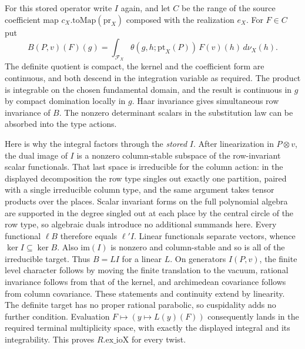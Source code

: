 For this stored operator write $I$ again, and let $C$ be the range
of the source coefficient map $c_X.\mathrm{toMap}(\mathrm{pr}_X)$
composed with the realization $e_X$. For $F\in C$ put
\[
 B(P,v)(F)(g)=\int_{\mathcal F_X}
      \theta(g,h;\mathrm{pt}_X(P))\,F(v)(h)\,d\nu_X(h).
\]
The definite quotient is compact, the kernel and the coefficient form
are continuous, and both descend in the integration variable as
required. The product is integrable on the chosen fundamental domain,
and the result is continuous in $g$ by compact domination locally in
$g$. Haar invariance gives simultaneous row invariance of $B$. The
nonzero determinant scalars in the substitution law can be absorbed
into the type actions.

Here is why the integral factors through the \emph{stored} $I$.
After linearization in $P\otimes v$, the dual image of $I$ is a
nonzero column-stable subspace of the row-invariant scalar
functionals. That last space is irreducible for the column action:
in the displayed decomposition the row type singles out exactly one
partition, paired with a single irreducible column type, and the same
argument takes tensor products over the places. Scalar invariant forms
on the full polynomial algebra are supported in the degree singled out
at each place by the central circle of the row type, so algebraic duals
introduce no additional summands here. Every functional $\ell B$
therefore equals $\ell' I$. Linear functionals separate vectors,
whence $\ker I\subseteq\ker B$. Also $\mathrm{im}(I)$ is nonzero and
column-stable and so is all of the irreducible target. Thus $B=L I$
for a linear $L$. On generators $I(P,v)$, the finite level character
follows by moving the finite translation to the vacuum, rational
invariance follows from that of the kernel, and archimedean covariance
follows from column covariance. These statements and continuity
extend by linearity. The definite target has no proper rational
parabolic, so cuspidality adds no further condition. Evaluation
$F\mapsto (y\mapsto L(y)(F))$ consequently lands in the required
terminal multiplicity space, with exactly the displayed integral and
its integrability. This proves $R.\mathrm{ex\_ioX}$ for every twist.

